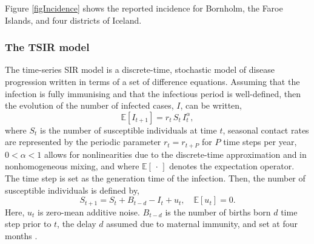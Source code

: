\documentclass[10pt]{article}
\begin{document}
Figure \ref{figIncidence} shows the reported incidence for Bornholm, the Faroe Islands, and four districts of Iceland.










\subsubsection*{The TSIR model}

The time-series SIR model \cite{Finkenstadt2000} is a discrete-time, stochastic model of disease progression written in terms of a set of difference equations. Assuming that the infection is fully immunising and that the infectious period is well-defined, then the evolution of the number of infected cases, $I$, can be written,
\begin{equation}
\mathbb{E}\left[I_{t+1}\right] = r_t \, S_t \, I_t^\alpha,
\label{TSIR_I}
\end{equation}
where $S_t$ is the number of susceptible individuals at time $t$, seasonal contact rates are represented by the periodic parameter $r_t = r_{t+P}$ for $P$ time steps per year, $0 < \alpha < 1$ allows for nonlinearities due to the discrete-time approximation and in nonhomogeneous mixing, and where $\mathbb{E}\left[\,\cdot\,\right]$ denotes the expectation operator. The time step is set as the generation time of the infection. Then, the number of susceptible individuals is defined by,
\begin{equation}
S_{t+1} = S_t + B_{t-d} - I_t + u_t, \quad \mathbb{E}\left[u_t\right] = 0.
\label{TSIR_S}
\end{equation}
Here, $u_t$ is  zero-mean additive noise. $B_{t-d}$ is the number of births born $d$ time step prior to $t$, the delay $d$ assumed due to maternal immunity, and set at four months \cite{Anderson1991}.
\end{document}
